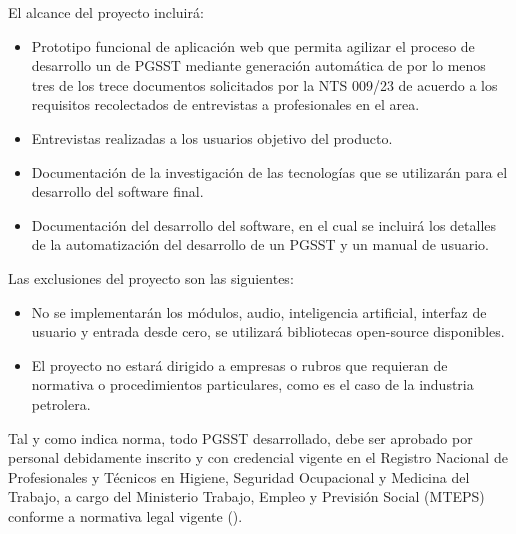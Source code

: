 \noindent
El alcance del proyecto incluirá:

\begin{itemize}
	\item Prototipo funcional de aplicación web que permita agilizar el proceso de desarrollo un de PGSST mediante generación automática de por lo menos tres de los trece documentos solicitados por la NTS 009/23 de acuerdo a los requisitos recolectados de entrevistas a profesionales en el area.
	\item Entrevistas realizadas a los usuarios objetivo del producto.
	\item Documentación de la investigación de las tecnologías que se utilizarán para el
	desarrollo del software final.
	\item Documentación del desarrollo del software, en el cual se incluirá los detalles de la automatización del desarrollo de un PGSST y un manual de usuario.
\end{itemize}

\noindent
Las exclusiones del proyecto son las siguientes:
\begin{itemize}
	\item No se implementarán los módulos, audio, inteligencia artificial, interfaz de usuario y entrada desde cero, se utilizará bibliotecas open-source disponibles.
	\item El proyecto no estará dirigido a empresas o rubros que requieran de normativa o procedimientos particulares, como es el caso de la industria petrolera.
\end{itemize}

Tal y como indica norma, todo PGSST desarrollado, debe ser aprobado por personal debidamente inscrito y con credencial vigente en el Registro Nacional de Profesionales y Técnicos en Higiene, Seguridad Ocupacional y Medicina del Trabajo, a cargo del Ministerio Trabajo, Empleo y Previsión Social (MTEPS) conforme a normativa legal vigente (\cite{NTS-009/23}).
